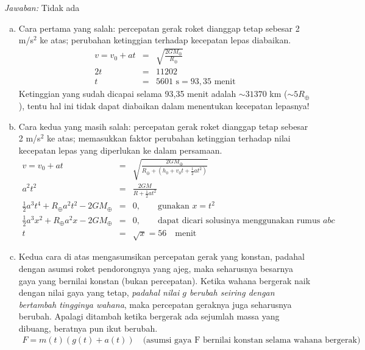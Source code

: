\documentclass[11pt,fleqn]{exam}
\begin{document}
\begin{questions}
\textit{Jawaban: } Tidak ada

\begin{enumerate}[a)]
\item Cara pertama yang salah: percepatan gerak roket dianggap tetap sebesar 2 m/s$^2$ ke atas; perubahan ketinggian terhadap kecepatan lepas diabaikan.
\begin{eqnarray*}
v = v_0 + at &=& \sqrt{\frac{2GM_{\oplus}}{R_{\oplus}}}\\
2t &=& 11202\\
t &=& 5601\text{   s} = 93,35 \text{  menit}
\end{eqnarray*}
Ketinggian yang sudah dicapai selama 93,35 menit adalah $\sim 31370$ km ($\sim 5R_{\oplus}$), tentu hal ini tidak dapat diabaikan dalam menentukan kecepatan lepasnya!

\item Cara kedua yang masih salah: percepatan gerak roket dianggap tetap sebesar 2 m/s$^2$ ke atas; memasukkan faktor perubahan ketinggian terhadap nilai kecepatan lepas yang diperlukan ke dalam persamaan.
\begin{eqnarray*}
v = v_0 + at &=& \sqrt{\frac{2GM_{\oplus}}{R_{\oplus}+(h_0 + v_0 t + \frac{1}{2} a t^2)}}\\
a^2 t^2 &=& \frac{2GM}{R + \frac{1}{2} a t^2}\\
\frac{1}{2} a^3 t^4 + R_{\oplus} a^2 t^2 - 2GM_{\oplus} &=& 0, \qquad \text{gunakan  } x = t^2\\
\frac{1}{2} a^3 x^2 + R_{\oplus} a^2 x - 2GM_{\oplus} &=& 0, \qquad \text{dapat dicari solusinya menggunakan rumus } abc\\
t &=& \sqrt{x} = 56 \quad \text{menit}
\end{eqnarray*}

\item Kedua cara di atas mengasumsikan percepatan gerak yang konstan, padahal dengan asumsi roket pendorongnya yang ajeg, maka seharusnya besarnya gaya yang bernilai konstan (bukan percepatan). Ketika wahana bergerak naik dengan nilai gaya yang tetap, \textit{padahal nilai $g$ berubah seiring dengan bertambah tingginya wahana}, maka percepatan geraknya juga seharusnya berubah. Apalagi ditambah ketika bergerak ada sejumlah massa yang dibuang, beratnya pun ikut berubah.
\begin{eqnarray*}
F = m(t) (g(t) + a(t)) \quad \text{(asumsi gaya F bernilai konstan selama wahana bergerak)}
\end{eqnarray*}

\end{enumerate}




\end{questions}
\end{document}

